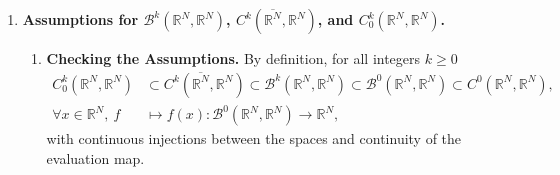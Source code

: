 \documentclass{book}
\numberwithin{equation}{section}
\newtheorem{theorem}{Theorem}[section]
\begin{document}
\begin{enumerate}
\begin{theorem}
\begin{itemize}
            Then \textbf{(2.35)}
            \begin{align*}
                \mathcal{G}\left(\Omega_0\right) := \left\{F\in\mathcal{F}(\Theta);F\left(\Omega_0\right) = \Omega_0\right\}
            \end{align*}
            is a closed subgroup of $\mathcal{F}(\Theta)$.
        \end{itemize}
    \end{theorem}
    Finally, it is interesting to recall that A. M. Micheletti [1] used the quotient metric to prove the following theorem.
    
    \begin{theorem}
        Fix $k = 3$, the Courant metric of $\mathcal{F}(C_0^3(\mathbb{R}^N,\mathbb{R}^N))/\mathcal{G}(\Omega_0)$, and a bounded open connected domain $\Omega_0$ of class $C^3$ in $\mathbb{R}^N$. Let $\mathcal{X}(\Omega_0)$ be the family of images of $\Omega_0$ by elements of $\mathcal{F}(C_0^3(\mathbb{R}^N,\mathbb{R}^N))/\mathcal{G}(\Omega_0)$.
        
        The subset of all bounded open domains $\Omega$ in $\mathcal{X}(\Omega_0)$ s.t. the spectrum of the Laplace operator $-\Delta$ on $\Omega$ with homogeneous Dirichlet conditions on the boundary $\partial\Omega$ does not have all its eigenvalues simple is of the 1st category.\footnote{A set $B$ is said to be \textit{nowhere dense} if its closure has no interior or, alternatively, if $B^c$ is dense.
            
            A set is said to be of the \textit{1st category} if it is the countable union of nowhere dense sets (cf. J. Dugundji [1, Def. 10.4, p. 250]).}
    \end{theorem}
    This theorem says that, up to an arbitrarily small perturbation of the domain, the eigenvalues of the Laplace operator of a $C^3$-domain can be made simple.
    \item \textbf{Assumptions for $\mathcal{B}^k(\mathbb{R}^N,\mathbb{R}^N)$, $C^k(\overline{\mathbb{R}^N},\mathbb{R}^N)$, and $C_0^k(\mathbb{R}^N,\mathbb{R}^N)$.}
    \begin{enumerate}
        \item \textbf{Checking the Assumptions.} By definition, for all integers $k\ge 0$
        \begin{align*}
            C_0^k(\mathbb{R}^N,\mathbb{R}^N)&\subset C^k(\overline{\mathbb{R}^N},\mathbb{R}^N)\subset\mathcal{B}^k(\mathbb{R}^N,\mathbb{R}^N)\subset\mathcal{B}^0(\mathbb{R}^N,\mathbb{R}^N)\subset C^0(\mathbb{R}^N,\mathbb{R}^N),\\
            \forall x\in\mathbb{R}^N,\ f&\mapsto f(x):\mathcal{B}^0(\mathbb{R}^N,\mathbb{R}^N)\to\mathbb{R}^N,
        \end{align*}
        with continuous injections between the spaces and continuity of the evaluation map.
        

\end{enumerate}
\end{enumerate}
\end{document}
